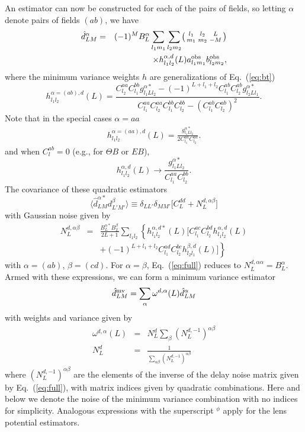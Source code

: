 \documentclass[prd,amsmath,amssymb,floatfix,superscriptaddress,nofootinbib,twocolumn]{revtex4-1}
\def\be{\begin{equation}}
\def\ee{\end{equation}}
\def\bea{\begin{eqnarray}}
\def\eea{\end{eqnarray}}
\newcommand{\ec}[1]{Eq.~(\ref{eq:#1})}
\newcommand{\eql}[1]{\label{eq:#1}}
\begin{document}
An estimator can now be constructed for each of the pairs of fields, so letting $\alpha$ denote pairs of fields $(ab)$, we have
\bea
\hat{d}^{\alpha}_{LM} &=&\nonumber  (-1)^{M} B_{L}^{\alpha}\sum_{l_{1}m_{1}}\sum_{l_{2}m_{2}}\bigl(\begin{smallmatrix} l_1 & l_2 & L \\ m_1 & m_2 & -M  \end{smallmatrix}\bigr) \\
&& \times h^{\alpha,d}_{l_{1}l_{2}}(L) a^{\rm obs}_{l_{1}m_{1}}b^{\rm obs}_{l_{2}m_{2}} ,
\eea
where the minimum variance weights $h$ are generalizations of \ec{bt} 
\be
h^{\alpha=(ab),d}_{l_{1}l_{2}}(L) 
= \frac{C_{l_{2}}^{aa}C_{l_{1}}^{bb}g^{\alpha*}_{l_{1}Ll_{2}}-(-1)^{L+l_{1}+l_{2}}C_{l_{1}}^{ab}C_{l_{2}}^{ab}g^{\alpha*}_{l_{2}Ll_{1}}}{C_{l_{1}}^{aa}C_{l_{2}}^{aa}C_{l_{1}}^{bb}C_{l_{2}}^{bb}-(C_{l_{1}}^{ab}C_{l_{2}}^{ab})^{2}}.
\ee
Note that in the special cases $\alpha=aa$
\bea 
h_{l_{1}l_{2}}^{\alpha=(aa),d}(L)= \frac{g_{l_{1}Ll_{2}}^{\alpha*}}{2C_{l_{1}}^{aa}C_{l_{2}}^{aa}}. 
\eea 
and when $C_{l}^{ab}=0$ (e.g., for $\Theta B$ or $EB$),
\be
h^{\alpha,d}_{l_{1}l_{2}}(L) \rightarrow \frac{g^{\alpha *}_{l_{1}Ll_{2}}}{C_{l_{1}}^{aa}C_{l_{2}}^{bb}}. 
\ee
The covariance of these quadratic estimators
\be
\langle \hat{d}^{\alpha*}_{LM}d^{\beta}_{L'M'}\rangle \equiv \delta_{LL'}\delta_{MM'}\big[ C_{L}^{dd}+N_{L}^{d,\alpha \beta} \big]
\ee
with Gaussian noise given by
\bea
N_{L}^{d,\alpha\beta}&=&\frac{B_{L}^{\alpha*}B_{L}^{\beta}}{2L+1}\sum_{l_{1}l_{2}}  \left\{ h_{l_{1}l_{2}}^{\alpha,d*} (L)\big[ C_{l_{1}}^{ac}C_{l_{2}}^{bd}h_{l_{1}l_{2}}^{\alpha,d}(L)\right. \nonumber \\
&&\left. +(-1)^{L+l_{1}+l_{2}}C_{l_{1}}^{ad}C_{l_{2}}^{bc} h_{l_{2}l_{1}}^{\beta,d}(L)  \big]\right\} \eql{full} 
\eea
with $\alpha=(ab)$, $\beta=(cd)$. For $\alpha=\beta$, \ec{full} reduces to $N_{L}^{d,\alpha\alpha}=B_{L}^{\alpha}$.
Armed with these expressions, we can form a minimum variance estimator
\be
\hat{d}^{\rm mv}_{LM} = \sum_{\alpha}\omega^{d,\alpha}(L)\hat{d}^{\alpha}_{LM}  
\eql{dmvw}
\ee
with weights and variance given by
\bea
\omega^{d,\alpha}(L) & =&N^{d}_{L} \sum_{\beta}(N_{L}^{d,-1})^{\alpha \beta} \eql{weight} \nonumber\\
N^{d}_{L} &=& \frac{1}{\sum_{\alpha\beta} (N_{L}^{d,-1})^{\alpha \beta}}
\eea
where $(N_{L}^{d,-1})^{\alpha\beta}$ are the elements of the inverse of the delay noise matrix given by \ec{full}, with matrix indices given by quadratic combinations. Here and below
we denote the noise of the minimum variance combination with no indices for simplicity.  Analogous expressions with the superscript $^\phi$ apply for the lens potential estimators.
\end{document}

